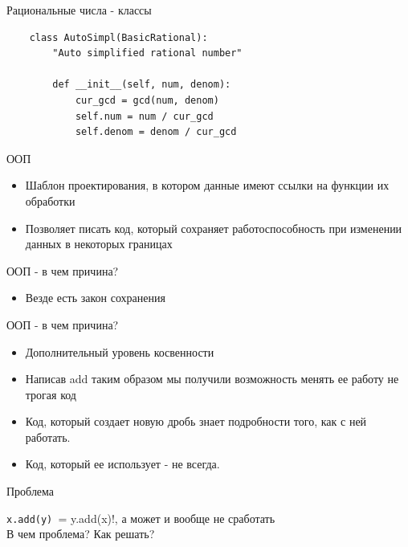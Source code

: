 \documentclass{article}
\begin{document}
\begin{center} Рациональные числа - классы \end{center}
\begin{lstlisting}
    class AutoSimpl(BasicRational):
        "Auto simplified rational number"
    
        def __init__(self, num, denom):
            cur_gcd = gcd(num, denom)
            self.num = num / cur_gcd
            self.denom = denom / cur_gcd
\end{lstlisting}
\newpage

\begin{center} ООП \end{center}
\begin{itemize}
    \item Шаблон проектирования, в котором данные имеют 
            ссылки на функции их обработки
    \item Позволяет писать код, который сохраняет работоспособность 
            при изменении данных в некоторых границах
\end{itemize}
\newpage

\begin{center} ООП - в чем причина? \end{center}
\begin{itemize}
    \item Везде есть закон сохранения
\end{itemize}
\newpage

\begin{center} ООП - в чем причина? \end{center}
\begin{itemize}
    \item Дополнительный уровень косвенности
    \item Написав add таким образом мы получили возможность 
            менять ее работу не трогая код
    \item Код, который создает новую дробь знает подробности того, как с ней работать.
    \item Код, который ее использует - не всегда.
\end{itemize}
\newpage

\begin{center} Проблема \end{center}
    \lstinline!x.add(y) != y.add(x)!, а может и вообще не сработать \\
    В чем проблема? Как решать?
\newpage
\end{document}
